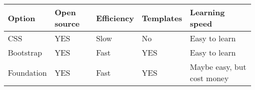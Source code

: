\documentclass{article}
\begin{document}
		\begin{center}
			\begin{tabular}{ | l | l | l | l |p{5cm} |}
			\hline
			Option & Open source & Efficiency & Templates & Learning speed\\ \hline
			CSS & YES & Slow & No & Easy to learn\\ \hline
			Bootstrap & YES & Fast & YES & Easy to learn\\ \hline
			Foundation & YES & Fast & YES & Maybe easy, but cost money\\ \hline
			\end{tabular}
		\end{center}
	
\end{document}
